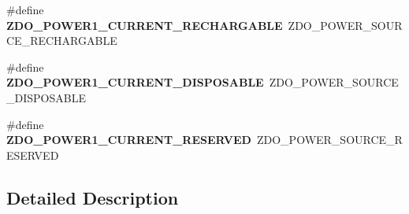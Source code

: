 \begin{DoxyCompactItemize}
\item 
\hypertarget{group__zdo_ga1d45b95a0a987d3e10d5b81447783491}{\#define {\bfseries Z\-D\-O\-\_\-\-P\-O\-W\-E\-R1\-\_\-\-C\-U\-R\-R\-E\-N\-T\-\_\-\-R\-E\-C\-H\-A\-R\-G\-A\-B\-L\-E}~Z\-D\-O\-\_\-\-P\-O\-W\-E\-R\-\_\-\-S\-O\-U\-R\-C\-E\-\_\-\-R\-E\-C\-H\-A\-R\-G\-A\-B\-L\-E}\label{group__zdo_ga1d45b95a0a987d3e10d5b81447783491}

\item 
\hypertarget{group__zdo_ga95049e82db572f2fc8ebf1357ee37a03}{\#define {\bfseries Z\-D\-O\-\_\-\-P\-O\-W\-E\-R1\-\_\-\-C\-U\-R\-R\-E\-N\-T\-\_\-\-D\-I\-S\-P\-O\-S\-A\-B\-L\-E}~Z\-D\-O\-\_\-\-P\-O\-W\-E\-R\-\_\-\-S\-O\-U\-R\-C\-E\-\_\-\-D\-I\-S\-P\-O\-S\-A\-B\-L\-E}\label{group__zdo_ga95049e82db572f2fc8ebf1357ee37a03}

\item 
\hypertarget{group__zdo_ga7fd4a3248c8e543fc0daf67586be5c1a}{\#define {\bfseries Z\-D\-O\-\_\-\-P\-O\-W\-E\-R1\-\_\-\-C\-U\-R\-R\-E\-N\-T\-\_\-\-R\-E\-S\-E\-R\-V\-E\-D}~Z\-D\-O\-\_\-\-P\-O\-W\-E\-R\-\_\-\-S\-O\-U\-R\-C\-E\-\_\-\-R\-E\-S\-E\-R\-V\-E\-D}\label{group__zdo_ga7fd4a3248c8e543fc0daf67586be5c1a}

\end{DoxyCompactItemize}


\subsection{Detailed Description}


